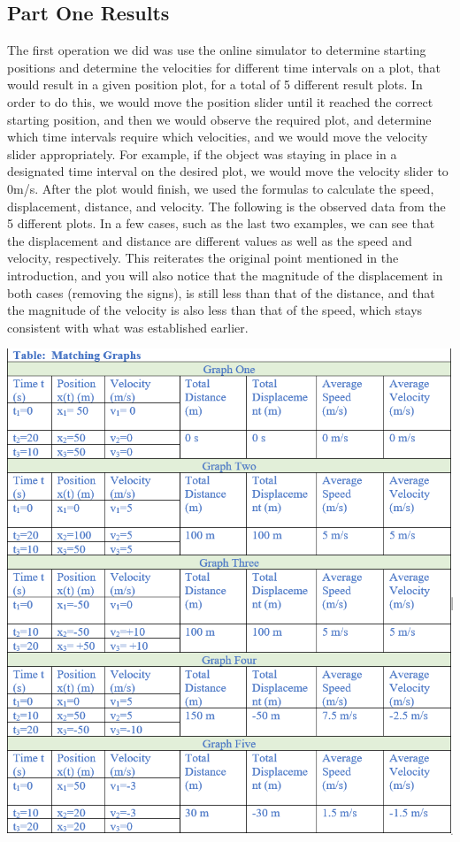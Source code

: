 \documentclass{article}
\begin{document}
\subsection {Part One Results}
The first operation we did was use the online simulator to determine starting positions and determine the velocities for different time intervals on a plot, that would result in a given position plot, for a total of 5 different result plots. In order to do this, we would move the position slider until it reached the correct starting position, and then we would observe the required plot, and determine which time intervals require which velocities, and we would move the velocity slider appropriately. For example, if the object was staying in place in a designated time interval on the desired plot, we would move the velocity slider to 0m/s. After the plot would finish, we used the formulas to calculate the speed, displacement, distance, and velocity. The following is the observed data from the 5 different plots. In a few cases, such as the last two examples, we can see that the displacement and distance are different values as well as the speed and velocity, respectively. This reiterates the original point mentioned in the introduction, and you will also notice that the magnitude of the displacement in both cases (removing the signs), is still less than that of the distance, and that the magnitude of the velocity is also less than that of the speed, which stays consistent with what was established earlier. 
\begin{center}
\includegraphics[scale=0.6]{data1.png}
\end{center}
\end{document}
